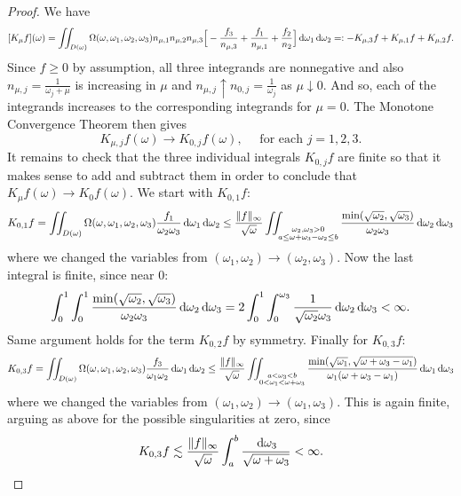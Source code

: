 \documentclass[reqno,11pt,letterpaper]{amsart}
\numberwithin{equation}{section}
\newcommand{\dd}{\, {\rm d}}
\begin{document}
\begin{proof}
 We have 
$$[K_\mu f](\omega) = \iint_{D(\omega)} \Omega (\omega, \omega_1, \omega_2, \omega _3) n_{\mu,1} n_{\mu,2} n_{\mu,3} \Big[- \frac{f_3}{n_{\mu,3}} + \frac{f_1}{n_{\mu,1}} + \frac{f_2}{n_2} 
\Big] \dd \omega_1 \dd \omega_2 =: -K_{\mu,3}f+K_{\mu,1}f+K_{\mu,2}f.
$$ 
Since $f \geq 0$ by assumption, all three integrands are nonnegative and also $n_{\mu,j} = \frac{1}{\omega_j+\mu}$ is increasing in $\mu$ and $ n_{\mu,j}  \uparrow n_{0,j}=\frac{1}{\omega_j}$ as $\mu\downarrow 0$. And so, each of the integrands increases to the corresponding integrands for $\mu=0$. The Monotone
Convergence Theorem then gives
$$  K_{\mu,j}f(\omega)  \to K_{0,j}f(\omega), \quad \text{ for each } j=1,2,3.
$$
It remains to check that the three individual integrals $K_{0,j}f$ are finite so that it makes sense to add and subtract them in order to conclude that $ K_{\mu}f(\omega) \to K_{0}f(\omega)$. We start with $K_{0,1}f$: 
$$ 
K_{0,1}f = \iint_{D(\omega)} \Omega (\omega, \omega_1, \omega_2, \omega _3) \frac{f_1}{\omega_2 \omega_3} \dd \omega_1 \dd\omega_2 \leq \frac{\|f\|_{\infty}}{\sqrt{\omega}} \iint_{\substack{\omega_2, \omega_3 >0\\ a\leq \omega+\omega_3-\omega_2\leq b}} \frac{ \operatorname{min}(\sqrt{\omega_2}, \sqrt{\omega_3})}{ \omega_2 \omega_3} \dd \omega_2 \dd\omega_3
$$
where we changed the variables from $(\omega_1, \omega_2) \to (\omega_2, \omega_3)$. Now the last integral is finite, since near $0$: 
$$ \int_0^1\int_0^1
\frac{\min ( \sqrt{\omega_2},\sqrt{\omega_3})}
{\omega_2\omega_3}
\dd \omega_2 \dd \omega_3 = 2\int_0^1\int_0^{\omega_3}
\frac{1}{\sqrt{\omega_2} \omega_3}
\dd \omega_2 \dd \omega_3 < \infty.$$
Same argument holds for the term $K_{0,2}f$ by symmetry. Finally for $K_{0,3}f$: 
$$ K_{0,3}f = \iint_{D(\omega)} \Omega (\omega, \omega_1, \omega_2, \omega _3) \frac{f_3}{\omega_1 \omega_2} \dd \omega_1 \dd\omega_2 \leq \frac{\|f\|_{\infty}}{\sqrt{\omega}} \iint_{\substack{ a<\omega_3<b\\0<\omega_1 < \omega + \omega_3}} \frac{ \operatorname{min}(\sqrt{\omega_1}, \sqrt{\omega+\omega_3-\omega_1})}{ \omega_1 (\omega+\omega_3-\omega_1)} \dd \omega_1 \dd\omega_3
$$
where we changed the variables from $(\omega_1, \omega_2) \to (\omega_1, \omega_3)$. 
This is again finite, arguing as above for the possible singularities at zero, since 
$$  K_{0,3}f \lesssim \frac{\|f\|_{\infty}}{\sqrt{\omega}} \int_a^b \frac{\dd \omega_3}{\sqrt{\omega+\omega_3}}<\infty.$$
\end{proof}
\end{document}

